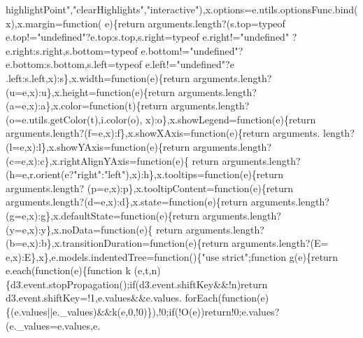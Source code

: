 \begin{DoxyCode}
{      highlightPoint"},\textcolor{stringliteral}{"clearHighlights"},\textcolor{stringliteral}{"interactive"}),x.options=e.utils.optionsFunc.bind(x),x.margin=\textcolor{keyword}{function}(
      e)\{\textcolor{keywordflow}{return} arguments.length?(s.top=typeof e.top!=\textcolor{stringliteral}{"undefined"}?e.top:s.top,s.right=typeof e.right!=\textcolor{stringliteral}{"undefined"}
      ?e.right:s.right,s.bottom=typeof e.bottom!=\textcolor{stringliteral}{"undefined"}?e.bottom:s.bottom,s.left=typeof e.left!=\textcolor{stringliteral}{"undefined"}?e
      .left:s.left,x):s\},x.width=\textcolor{keyword}{function}(e)\{\textcolor{keywordflow}{return} arguments.length?(u=e,x):u\},x.height=\textcolor{keyword}{function}(e)\{\textcolor{keywordflow}{return} 
      arguments.length?(a=e,x):a\},x.color=\textcolor{keyword}{function}(t)\{\textcolor{keywordflow}{return} arguments.length?(o=e.utils.getColor(t),i.color(o),
      x):o\},x.showLegend=\textcolor{keyword}{function}(e)\{\textcolor{keywordflow}{return} arguments.length?(f=e,x):f\},x.showXAxis=\textcolor{keyword}{function}(e)\{\textcolor{keywordflow}{return} arguments.
      length?(l=e,x):l\},x.showYAxis=\textcolor{keyword}{function}(e)\{\textcolor{keywordflow}{return} arguments.length?(c=e,x):c\},x.rightAlignYAxis=\textcolor{keyword}{function}(e)\{\textcolor{keywordflow}{
      return} arguments.length?(h=e,r.orient(e?\textcolor{stringliteral}{"right"}:\textcolor{stringliteral}{"left"}),x):h\},x.tooltips=\textcolor{keyword}{function}(e)\{\textcolor{keywordflow}{return} arguments.length?
      (p=e,x):p\},x.tooltipContent=\textcolor{keyword}{function}(e)\{\textcolor{keywordflow}{return} arguments.length?(d=e,x):d\},x.state=\textcolor{keyword}{function}(e)\{\textcolor{keywordflow}{return} 
      arguments.length?(g=e,x):g\},x.defaultState=\textcolor{keyword}{function}(e)\{\textcolor{keywordflow}{return} arguments.length?(y=e,x):y\},x.noData=\textcolor{keyword}{function}(e)\{\textcolor{keywordflow}{
      return} arguments.length?(b=e,x):b\},x.transitionDuration=\textcolor{keyword}{function}(e)\{\textcolor{keywordflow}{return} arguments.length?(E=
      e,x):E\},x\},e.models.indentedTree=\textcolor{keyword}{function}()\{\textcolor{stringliteral}{"use strict"};\textcolor{keyword}{function} g(e)\{\textcolor{keywordflow}{return} e.each(\textcolor{keyword}{function}(e)\{\textcolor{keyword}{function} k
      (e,t,n)\{d3.event.stopPropagation();\textcolor{keywordflow}{if}(d3.event.shiftKey&&!n)\textcolor{keywordflow}{return} d3.event.shiftKey=!1,e.values&&e.values.
      forEach(\textcolor{keyword}{function}(e)\{(e.values||e.\_values)&&k(e,0,!0)\}),!0;\textcolor{keywordflow}{if}(!O(e))\textcolor{keywordflow}{return}!0;e.values?(e.\_values=e.values,e.

\end{DoxyCode}
